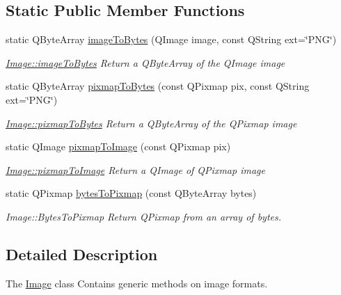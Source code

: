 \subsection*{Static Public Member Functions}
\begin{DoxyCompactItemize}
\item 
static Q\-Byte\-Array \hyperlink{classUtils_1_1Image_abbc5e8f3834a045d47e161e4ec366e6b}{image\-To\-Bytes} (Q\-Image image, const Q\-String ext=\char`\"{}P\-N\-G\char`\"{})
\begin{DoxyCompactList}\small\item\em \hyperlink{classUtils_1_1Image_abbc5e8f3834a045d47e161e4ec366e6b}{Image\-::image\-To\-Bytes} Return a Q\-Byte\-Array of the Q\-Image {\itshape image} \end{DoxyCompactList}\item 
static Q\-Byte\-Array \hyperlink{classUtils_1_1Image_a2e182d6808450398f1c1bc6f6ed6e6a1}{pixmap\-To\-Bytes} (const Q\-Pixmap pix, const Q\-String ext=\char`\"{}P\-N\-G\char`\"{})
\begin{DoxyCompactList}\small\item\em \hyperlink{classUtils_1_1Image_a2e182d6808450398f1c1bc6f6ed6e6a1}{Image\-::pixmap\-To\-Bytes} Return a Q\-Byte\-Array of the Q\-Pixmap {\itshape image} \end{DoxyCompactList}\item 
static Q\-Image \hyperlink{classUtils_1_1Image_a46e214e9d7fabf71ecd7ff9c041c198a}{pixmap\-To\-Image} (const Q\-Pixmap pix)
\begin{DoxyCompactList}\small\item\em \hyperlink{classUtils_1_1Image_a46e214e9d7fabf71ecd7ff9c041c198a}{Image\-::pixmap\-To\-Image} Return a Q\-Image of Q\-Pixmap {\itshape image} \end{DoxyCompactList}\item 
static Q\-Pixmap \hyperlink{classUtils_1_1Image_ad0726573f77f6af54d89908810feba4d}{bytes\-To\-Pixmap} (const Q\-Byte\-Array bytes)
\begin{DoxyCompactList}\small\item\em Image\-::\-Bytes\-To\-Pixmap Return Q\-Pixmap from an array of bytes. \end{DoxyCompactList}\end{DoxyCompactItemize}


\subsection{Detailed Description}
The \hyperlink{classUtils_1_1Image}{Image} class Contains generic methods on image formats. 

